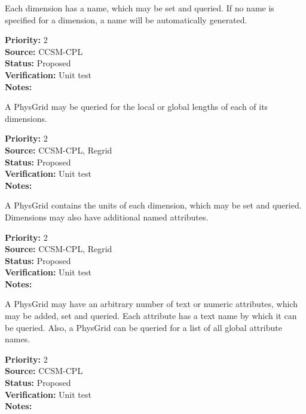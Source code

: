 Each dimension has a name, which may be set and queried.  If no name is specified
for a dimension, a name will be automatically generated.
\begin{reqlist}
{\bf Priority:} 2 \\
{\bf Source:} CCSM-CPL \\
{\bf Status:} Proposed \\
{\bf Verification:} Unit test \\
{\bf Notes:} 
\end{reqlist}

A PhysGrid may be queried for the local or global lengths of each of its dimensions.
\begin{reqlist}
{\bf Priority:} 2 \\
{\bf Source:} CCSM-CPL, Regrid \\
{\bf Status:} Proposed \\
{\bf Verification:} Unit test \\
{\bf Notes:} 
\end{reqlist}

A PhysGrid contains the units of each dimension, which may be set and queried. 
Dimensions may also have additional named attributes.
\begin{reqlist}
{\bf Priority:} 2 \\
{\bf Source:} CCSM-CPL, Regrid \\
{\bf Status:} Proposed \\
{\bf Verification:} Unit test \\
{\bf Notes:} 
\end{reqlist}

A PhysGrid may have an arbitrary number of text or numeric attributes,
which may be added, set and queried.  Each attribute has a text name by which it
can be queried.  Also, a PhysGrid can be queried for a list of all global
attribute names.

\begin{reqlist}
{\bf Priority:} 2 \\
{\bf Source:} CCSM-CPL \\
{\bf Status:} Proposed \\
{\bf Verification:} Unit test \\
{\bf Notes:} 
\end{reqlist}

